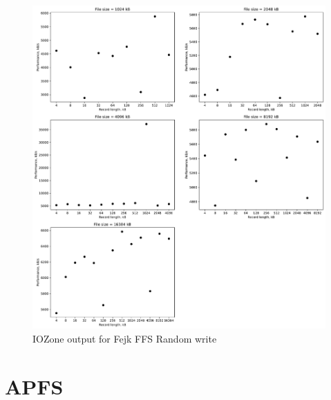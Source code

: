 \begin{figure}[!htb]
	\label{fig:app_bench_ffsf_rnd_write}
	\begin{center}
		\includegraphics[width=1.0\textwidth]{figures/benchmarking/fejk-ffs/Random write.pdf}
	\end{center}
	\caption{IOZone output for Fejk FFS Random write}
\end{figure}
\section{APFS}








